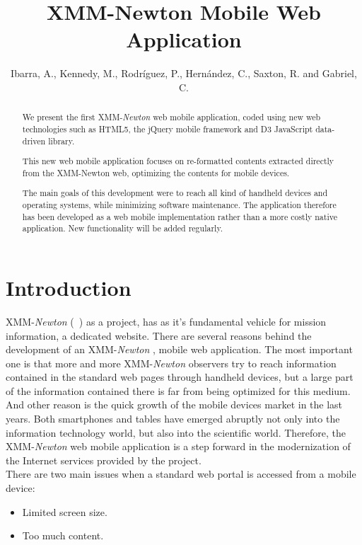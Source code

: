 \documentclass[11pt,twoside]{article}
\newcommand{\xmm}{{XMM-{\em Newton} }}
\begin{document}
\title{XMM-Newton Mobile Web Application}
\author{Ibarra, A., Kennedy, M., Rodr\'iguez, P., Hern\'andez, C., Saxton, R. and Gabriel, C.}

\begin{abstract}
We present the first \xmm web mobile application, coded using new web
technologies such as HTML5, the jQuery mobile framework and D3
JavaScript data-driven library.

This new web mobile application focuses on re-formatted contents
extracted directly from the XMM-Newton web, optimizing the contents for
mobile devices. 

The main goals of this development were to reach all kind of handheld
devices and operating systems, while minimizing software
maintenance. The application therefore has been developed as a web mobile
implementation rather than a more costly native application. New
functionality will be added regularly.

\end{abstract}

\section{Introduction}

\xmm (~\cite{Jansen}) as a project, has as it's fundamental vehicle
for mission information, a dedicated website. There are several
reasons behind the development of an \xmm, mobile web application. The
most important one is that more and more \xmm observers try to reach
information contained in the standard web pages through handheld
devices, but a large part of the information contained there is far
from being optimized for this medium. And other reason is the quick
growth of the mobile devices market in the last years.  Both
smartphones and tables have emerged abruptly not only into the
information technology world, but also into the scientific
world. Therefore, the \xmm web mobile application is a step forward in
the modernization of the Internet services provided by the project.\\
 
There are two main issues when a standard web portal is accessed from a mobile device:
\begin{itemize}
\item Limited screen size.
\item Too much content.
\end{itemize}
\end{document}
